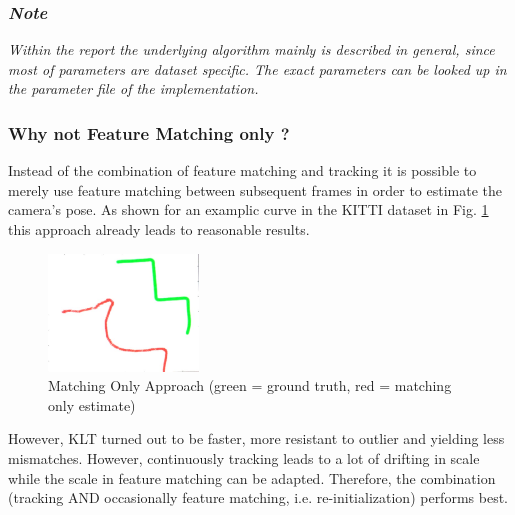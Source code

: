 \documentclass[letterpaper, 12 pt]{article}
\begin{document}
\begin{multicols*}{2}
\subsubsection{\textit{Note}}
\textit{Within the report the underlying algorithm mainly is described in general, since most of parameters are dataset specific. The exact parameters can be looked up in the parameter file of the implementation. }

\subsubsection{Why not Feature Matching only ?}
Instead of the combination of feature matching and tracking it is possible to merely use feature matching between subsequent frames in order to estimate the camera's pose. As shown for an examplic curve in the KITTI dataset in Fig. \ref{fig:matching_only} this approach already leads to reasonable results. 

\begin{figure}[H]
\begin{center}
\includegraphics[width=4cm]{matching_only.jpeg}
\end{center}
\caption{Matching Only Approach (green = ground truth, red = matching only estimate)}
\label{fig:matching_only}
\end{figure}

However, KLT turned out to be faster, more resistant to outlier and yielding less mismatches. However, continuously tracking leads to a lot of drifting in scale while the scale in feature matching can be adapted. Therefore, the combination (tracking AND occasionally feature matching, i.e. re-initialization) performs best. 


\end{multicols*}
\end{document}
